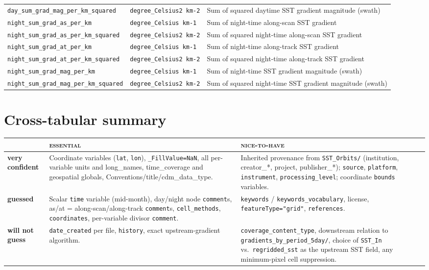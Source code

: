 \documentclass[11pt]{article}
\newcommand{\vc}{\textbf{very confident}}
\newcommand{\gs}{\textbf{guessed}}
\newcommand{\nc}{\textbf{will not guess}}
\newcommand{\es}{\textsc{essential}}
\newcommand{\nh}{\textsc{nice-to-have}}
\begin{document}
\begin{longtable}{@{}L{5.9cm} L{3.4cm} L{6.9cm}@{}}
\texttt{day\_sum\_grad\_mag\_per\_km\_squared}   & \texttt{degree\_Celsius2 km-2} & Sum of squared daytime SST gradient magnitude (swath) \\
\texttt{night\_sum\_grad\_as\_per\_km}           & \texttt{degree\_Celsius km-1} & Sum of night-time along-scan SST gradient \\
\texttt{night\_sum\_grad\_as\_per\_km\_squared}  & \texttt{degree\_Celsius2 km-2} & Sum of squared night-time along-scan SST gradient \\
\texttt{night\_sum\_grad\_at\_per\_km}           & \texttt{degree\_Celsius km-1} & Sum of night-time along-track SST gradient \\
\texttt{night\_sum\_grad\_at\_per\_km\_squared}  & \texttt{degree\_Celsius2 km-2} & Sum of squared night-time along-track SST gradient \\
\texttt{night\_sum\_grad\_mag\_per\_km}          & \texttt{degree\_Celsius km-1} & Sum of night-time SST gradient magnitude (swath) \\
\texttt{night\_sum\_grad\_mag\_per\_km\_squared} & \texttt{degree\_Celsius2 km-2} & Sum of squared night-time SST gradient magnitude (swath) \\
\bottomrule
\end{longtable}
\normalsize

\section{Cross-tabular summary}

\begin{center}
\renewcommand{\arraystretch}{1.15}
\begin{tabular}{@{}L{2.8cm} L{6.0cm} L{6.0cm}@{}}
\toprule
& \es{} & \nh{} \\
\midrule
\vc{}
& Coordinate variables (\texttt{lat}, \texttt{lon}), \texttt{\_FillValue=NaN}, all per-variable units and long\_names, time\_coverage and geospatial globals, Conventions/title/cdm\_data\_type.
& Inherited provenance from \texttt{SST\_Orbits/} (institution, creator\_*, project, publisher\_*); \texttt{source}, \texttt{platform}, \texttt{instrument}, \texttt{processing\_level}; coordinate \texttt{bounds} variables. \\
\midrule
\gs{}
& Scalar \texttt{time} variable (mid-month), day/night node \texttt{comment}s, as/at = along-scan/along-track \texttt{comment}s, \texttt{cell\_methods}, \texttt{coordinates}, per-variable divisor \texttt{comment}.
& \texttt{keywords} / \texttt{keywords\_vocabulary}, license, \texttt{featureType="grid"}, \texttt{references}. \\
\midrule
\nc{}
& \texttt{date\_created} per file, \texttt{history}, exact upstream-gradient algorithm.
& \texttt{coverage\_content\_type}, downstream relation to \texttt{gradients\_by\_period\_5day/}, choice of \texttt{SST\_In} vs.\ \texttt{regridded\_sst} as the upstream SST field, any minimum-pixel cell suppression. \\
\bottomrule
\end{tabular}
\end{center}
\end{document}
